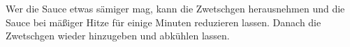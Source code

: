 \begin{recipe}
    \hint
    {
    	Wer die Sauce etwas sämiger mag, kann die Zwetschgen herausnehmen und die Sauce bei mäßiger Hitze für einige Minuten reduzieren lassen. Danach die Zwetschgen wieder hinzugeben und abkühlen lassen.
    }
\end{recipe}